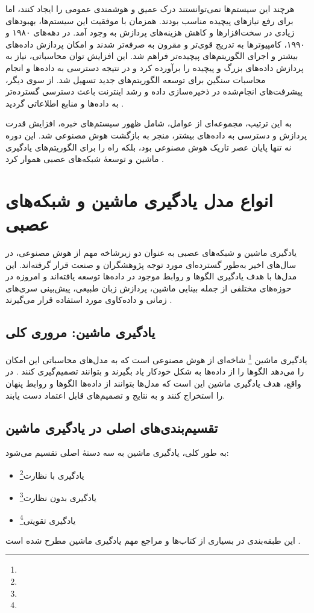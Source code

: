 هرچند این سیستم‌ها نمی‌توانستند درک عمیق و هوشمندی عمومی را ایجاد کنند، اما برای رفع نیازهای پیچیده مناسب بودند. همزمان با موفقیت این سیستم‌ها، بهبودهای زیادی در سخت‌افزارها و کاهش هزینه‌های پردازش به وجود آمد. در دهه‌های ۱۹۸۰ و ۱۹۹۰، کامپیوترها به تدریج قوی‌تر و مقرون به صرفه‌تر شدند و امکان پردازش داده‌های بیشتر و اجرای الگوریتم‌های پیچیده‌تر فراهم شد. این افزایش توان محاسباتی، نیاز به پردازش داده‌های بزرگ و پیچیده را برآورده کرد و در نتیجه دسترسی به داده‌ها و انجام محاسبات سنگین برای توسعه الگوریتم‌های جدید تسهیل شد. از سوی دیگر، پیشرفت‌های انجام‌شده در ذخیره‌سازی داده و رشد اینترنت باعث دسترسی گسترده‌تر به داده‌ها و منابع اطلاعاتی گردید \cite{nilsson2010quest}.

به این ترتیب، مجموعه‌ای از عوامل، شامل ظهور سیستم‌های خبره، افزایش قدرت پردازش و دسترسی به داده‌های بیشتر، منجر به بازگشت هوش مصنوعی شد. این دوره نه تنها پایان عصر تاریک هوش مصنوعی بود، بلکه راه را برای الگوریتم‌های یادگیری ماشین و توسعهٔ شبکه‌های عصبی هموار کرد \cite{russell2016artificial}.


\section{انواع مدل یادگیری ماشین و شبکه‌های عصبی}\label{sec:ml-types}
یادگیری ماشین و شبکه‌های عصبی به عنوان دو زیرشاخه مهم از هوش مصنوعی، در سال‌های اخیر به‌طور گسترده‌ای مورد توجه پژوهشگران و صنعت قرار گرفته‌اند. این مدل‌ها با هدف یادگیری الگوها و روابط موجود در داده‌ها توسعه یافته‌اند و امروزه در حوزه‌های مختلفی از جمله بینایی ماشین، پردازش زبان طبیعی، پیش‌بینی سری‌های زمانی و داده‌کاوی مورد استفاده قرار می‌گیرند \cite{bishop2006pattern,mitchell1997machine,murphy2012machine}.

\subsection{یادگیری ماشین: مروری کلی}
یادگیری ماشین \footnote{} شاخه‌ای از هوش مصنوعی است که به مدل‌های محاسباتی این امکان را می‌دهد الگوها را از داده‌ها به شکل خودکار یاد بگیرند و بتوانند تصمیم‌گیری کنند
\cite{goodfellow2016deep,mitchell1997machine}.
در واقع، هدف یادگیری ماشین این است که مدل‌ها بتوانند از داده‌ها الگوها و روابط پنهان را استخراج کنند و به نتایج و تصمیم‌های قابل اعتماد دست یابند.

\subsection{تقسیم‌بندی‌های اصلی در یادگیری ماشین}
به طور کلی، یادگیری ماشین به سه دستهٔ اصلی تقسیم می‌شود:
\begin{itemize}
 	\item یادگیری با نظارت\footnote{}
	\item یادگیری بدون نظارت\footnote{}
	\item یادگیری تقویتی\footnote{}	
\end{itemize}
این طبقه‌بندی در بسیاری از کتاب‌ها و مراجع مهم یادگیری ماشین مطرح شده است
\cite{bishop2006pattern,murphy2012machine}.

